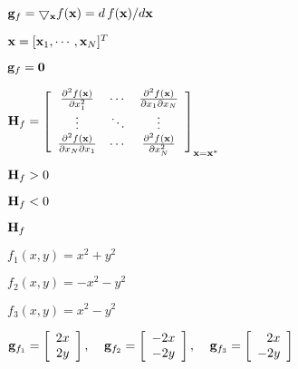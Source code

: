 \documentclass{article}
\def\lthtmlcheckvsize{\ifdim\ht\sizebox<\vsize 
  \ifdim\wd\sizebox<\hsize\expandafter\hfill\fi \expandafter\vfill
  \else\expandafter\vss\fi}%
\begin{document}
{\newpage\clearpage
{}%
$ {\bf g}_f=\bigtriangledown_{\bf x} f({\bf x})=d\,f({\bf x})/d{\bf x}$%
\lthtmlindisplaymathZ
\lthtmlcheckvsize\clearpage}

{\newpage\clearpage
{}%
$ {\bf x}=[{\bf x}_1,\cdots,{\bf x}_N]^T$%
\lthtmlindisplaymathZ
\lthtmlcheckvsize\clearpage}

{\newpage\clearpage
{}%
$ {\bf g}_f={\bf0}$%
\lthtmlindisplaymathZ
\lthtmlcheckvsize\clearpage}

{\newpage\clearpage
{}%
$\displaystyle {\bf H}_f=\left[ \begin{array}{ccc}
\frac{\partial^2 f({\bf x})}{\partial x_1^2} & \cdots &
\frac{\partial^2 f({\bf x})}{\partial x_1\partial x_N} \\
\vdots & \ddots & \vdots \\
\frac{\partial^2 f({\bf x})}{\partial x_N\partial x_1} & \cdots &
\frac{\partial^2 f({\bf x})}{\partial x_N^2}
\end{array} \right]_{{\bf x}={\bf x}^*}$%
\lthtmlindisplaymathZ
\lthtmlcheckvsize\clearpage}

{\newpage\clearpage
{}%
$ {\bf H}_f>0$%
\lthtmlindisplaymathZ
\lthtmlcheckvsize\clearpage}

{\newpage\clearpage
{}%
$ {\bf H}_f<0$%
\lthtmlindisplaymathZ
\lthtmlcheckvsize\clearpage}

{\newpage\clearpage
{}%
$ {\bf H}_f$%
\lthtmlindisplaymathZ
\lthtmlcheckvsize\clearpage}

{\newpage\clearpage
{}%
$ f_1(x,y)=x^2+y^2$%
\lthtmlindisplaymathZ
\lthtmlcheckvsize\clearpage}

{\newpage\clearpage
{}%
$ f_2(x,y)=-x^2-y^2$%
\lthtmlindisplaymathZ
\lthtmlcheckvsize\clearpage}

{\newpage\clearpage
{}%
$ f_3(x,y)=x^2-y^2$%
\lthtmlindisplaymathZ
\lthtmlcheckvsize\clearpage}

{\newpage\clearpage
{}%
$\displaystyle {\bf g}_{f_1}=\left[\begin{array}{c}2x\\2y\end{array}\right],
\;\;\;\;
{\bf g}_{f_2}=\left[\begin{array}{c}-2x\\-2y\end{array}\right],
\;\;\;\;
{\bf g}_{f_3}=\left[\begin{array}{r}2x\\-2y\end{array}\right]$%
\lthtmlindisplaymathZ
\lthtmlcheckvsize\clearpage}
\end{document}
